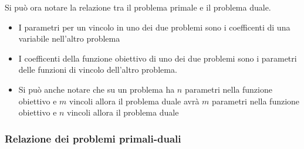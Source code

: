 \documentclass{article}
\begin{document}
Si può ora notare la relazione tra il problema primale e il problema duale.
\begin{itemize}
  \item I parametri per un vincolo in uno dei due problemi sono i coefficenti di una variabile nell'altro problema
  \item I coefficenti della funzione obiettivo di uno dei due problemi sono i parametri delle funzioni di vincolo dell'altro problema.
  \item Si può anche notare che su un problema ha $n$ parametri nella funzione obiettivo e $m$ vincoli allora il problema duale avrà $m$ parametri nella funzione obiettivo e $n$ vincoli allora il problema duale
\end{itemize}

\subsubsection{Relazione dei problemi primali-duali}

  
\end{document}
